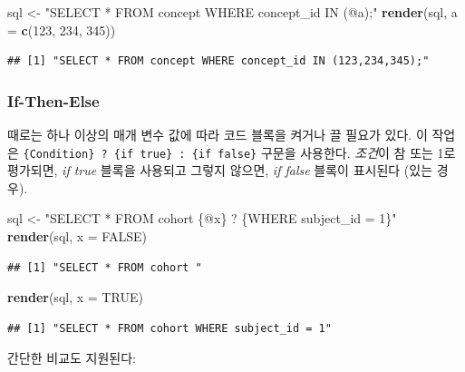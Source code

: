 \documentclass[11pt]{book}
\newenvironment{Shaded}{\begin{snugshade}}{\end{snugshade}}
\newcommand{\KeywordTok}[1]{\textcolor[rgb]{0.13,0.29,0.53}{\textbf{#1}}}
\newcommand{\DataTypeTok}[1]{\textcolor[rgb]{0.13,0.29,0.53}{#1}}
\newcommand{\DecValTok}[1]{\textcolor[rgb]{0.00,0.00,0.81}{#1}}
\newcommand{\StringTok}[1]{\textcolor[rgb]{0.31,0.60,0.02}{#1}}
\newcommand{\OtherTok}[1]{\textcolor[rgb]{0.56,0.35,0.01}{#1}}
\newcommand{\NormalTok}[1]{#1}
\theoremstyle{definition}
\theoremstyle{definition}
\theoremstyle{definition}
\theoremstyle{remark}
\begin{document}
\begin{Shaded}
\begin{Highlighting}[]
\NormalTok{sql <-}\StringTok{ "SELECT * FROM concept WHERE concept_id IN (@a);"}
\KeywordTok{render}\NormalTok{(sql, }\DataTypeTok{a =} \KeywordTok{c}\NormalTok{(}\DecValTok{123}\NormalTok{, }\DecValTok{234}\NormalTok{, }\DecValTok{345}\NormalTok{))}
\end{Highlighting}
\end{Shaded}

\begin{verbatim}
## [1] "SELECT * FROM concept WHERE concept_id IN (123,234,345);"
\end{verbatim}

\subsubsection*{If-Then-Else}\label{if-then-else}

때로는 하나 이상의 매개 변수 값에 따라 코드 블록을 켜거나 끌 필요가
있다. 이 작업은
\texttt{\{Condition\}\ ?\ \{if\ true\}\ :\ \{if\ false\}} 구문을
사용한다. \emph{조건}이 참 또는 1로 평가되면, \emph{if true} 블록을
사용되고 그렇지 않으면, \emph{if false} 블록이 표시된다 (있는 경우).

\begin{Shaded}
\begin{Highlighting}[]
\NormalTok{sql <-}\StringTok{ "SELECT * FROM cohort \{@x\} ? \{WHERE subject_id = 1\}"}
\KeywordTok{render}\NormalTok{(sql, }\DataTypeTok{x =} \OtherTok{FALSE}\NormalTok{)}
\end{Highlighting}
\end{Shaded}

\begin{verbatim}
## [1] "SELECT * FROM cohort "
\end{verbatim}

\begin{Shaded}
\begin{Highlighting}[]
\KeywordTok{render}\NormalTok{(sql, }\DataTypeTok{x =} \OtherTok{TRUE}\NormalTok{)}
\end{Highlighting}
\end{Shaded}

\begin{verbatim}
## [1] "SELECT * FROM cohort WHERE subject_id = 1"
\end{verbatim}

간단한 비교도 지원된다:
\end{document}
